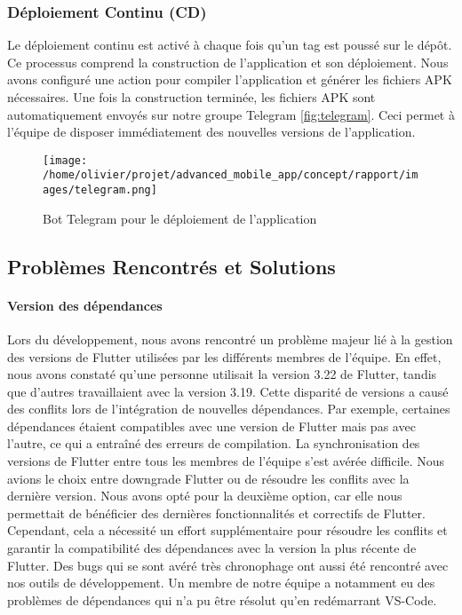 \subsubsection{Déploiement Continu (CD)}

Le déploiement continu est activé à chaque fois qu'un tag est poussé sur le dépôt. Ce processus comprend la construction de l'application et son déploiement. Nous avons configuré une action pour compiler l'application et générer les fichiers APK nécessaires. Une fois la construction terminée, les fichiers APK sont automatiquement envoyés sur notre groupe Telegram \ref{fig:telegram}. Ceci permet à l'équipe de disposer immédiatement des nouvelles versions de l'application.

\begin{figure}[h]{
        \centering
        \texttt{[image: /home/olivier/projet/advanced\_mobile\_app/concept/rapport/images/telegram.png]}
        \caption{Bot Telegram pour le déploiement de l'application}
        \label{fig:telegram}
        \label{sec:problems}
    }
\end{figure}

\subsection{Problèmes Rencontrés et Solutions}


\paragraph{Version des dépendances} Lors du développement, nous avons rencontré un problème majeur lié à la gestion des versions de Flutter utilisées par les différents membres de l'équipe. En effet, nous avons constaté qu'une personne utilisait la version 3.22 de Flutter, tandis que d'autres travaillaient avec la version 3.19. Cette disparité de versions a causé des conflits lors de l'intégration de nouvelles dépendances. Par exemple, certaines dépendances étaient compatibles avec une version de Flutter mais pas avec l'autre, ce qui a entraîné des erreurs de compilation. La synchronisation des versions de Flutter entre tous les membres de l'équipe s'est avérée difficile. Nous avions le choix entre downgrade Flutter ou de résoudre les conflits avec la dernière version. Nous avons opté pour la deuxième option, car elle nous permettait de bénéficier des dernières fonctionnalités et correctifs de Flutter. Cependant, cela a nécessité un effort supplémentaire pour résoudre les conflits et garantir la compatibilité des dépendances avec la version la plus récente de Flutter. Des bugs qui se sont avéré très chronophage ont aussi été rencontré avec nos outils de développement. Un membre de notre équipe a notamment eu des problèmes de dépendances qui n'a pu être résolut qu'en redémarrant VS-Code.

